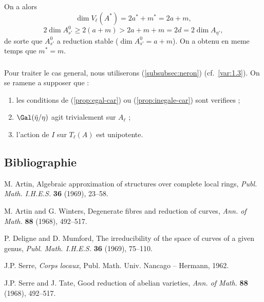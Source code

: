 On a alors
\[
\dim V_\ell(A^*) = 2a^* + m^* = 2a + m,
\]
\[
2 \dim A_{s'}^0 \geqslant 2(a + m) > 2a + m + m = 2d = 2 \dim A_{\eta'} ,
\]
de sorte que $A_{s'}^0$ a reduction stable ($\dim A_{s'}^0 = a + m$). On a obtenu en meme temps que $m^* = m$.

\subsubsection{}
\label{subsubsec:6.7}
Pour traiter le cas general, nous utiliserons (\ref{subsubsec:neron}) (cf.~\ref{var:1.3}). On se ramene a supposer que :
\begin{enumerate}[label=(\alph*)]
\item les conditions de (\ref{prop:egal-car}) ou (\ref{prop:inegale-car}) sont verifiees ;
\item $\Gal(\bar{\eta}/\eta)$ agit trivialement sur $A_\ell$ ;
\item l'action de $I$ sur $T_\ell(A)$ est unipotente.
\end{enumerate}

\subsection*{Bibliographie}
\label{subsec:bibliographie-I}

\begin{enumerate}[label={[\arabic*]}]
\item M. Artin, Algebraic approximation of structures over complete local rings, \emph{Publ. Math. I.H.E.S.} \textbf{36} (1969), 23--58.
\item M. Artin and G. Winters, Degenerate fibres and reduction of curves, \emph{Ann. of Math.} \textbf{88} (1968), 492--517.
\item P. Deligne and D. Mumford, The irreducibility of the space of curves of a given genus, \emph{Publ. Math. I.H.E.S.} \textbf{36} (1969), 75--110.
\item J.P. Serre, \emph{Corps locaux}, Publ. Math. Univ. Nancago -- Hermann, 1962.
\item J.P. Serre and J. Tate, Good reduction of abelian varieties, \emph{Ann. of Math.} \textbf{88} (1968), 492--517.
\end{enumerate}

